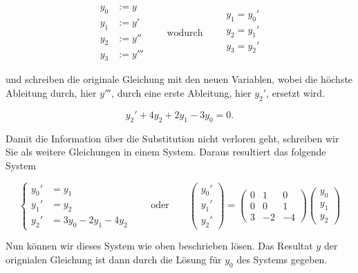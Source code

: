 \begin{equation*}
    \begin{aligned}
        y_0 &:= y \\
        y_1 &:= y' \\
        y_2 &:= y'' \\
        y_3 &:= y'''
    \end{aligned} \qquad \text{wodurch} \qquad
    \begin{aligned}
        y_1 = y_0' \\
        y_2 = y_1' \\
        y_3 = y_2' \\
    \end{aligned}
\end{equation*}

\vspace{0.25\baselineskip}

und schreiben die originale Gleichung mit den neuen Variablen, wobei die höchste Ableitung durch, hier \( y''' \), durch eine erste Ableitung, hier \( y_2' \), ersetzt wird. 

\begin{equation*}
    y_2' + 4y_2 + 2y_1 - 3y_0 = 0.
\end{equation*}

Damit die Information über die Substitution nicht verloren geht, schreiben wir Sie als weitere Gleichungen in einem System. Daraus resultiert das folgende System

\begin{equation*}
    \left\{ \begin{aligned}
        y_0' &= y_1 \\
        y_1' &= y_2 \\
        y_2' &= 3y_0 - 2y_1 -4y_2
    \end{aligned} \right. \qquad \text{oder} \qquad
    \begin{pmatrix}
        y_0' \\
        y_1' \\
        y_2'
    \end{pmatrix} =
    \begin{pmatrix}
        0 & 1 & 0 \\
        0 & 0 & 1 \\
        3 & -2 & -4
    \end{pmatrix}
    \begin{pmatrix}
        y_0 \\
        y_1 \\
        y_2
    \end{pmatrix} 
\end{equation*}

Nun können wir dieses System wie oben beschrieben lösen. Das Resultat \( y \) der orignialen Gleichung ist dann durch die Lösung für \( y_0 \) des Systems gegeben. 